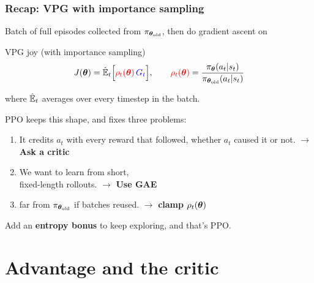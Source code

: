 \begin{frame}
    \frametitle{Recap: VPG with importance sampling}
    Batch of full episodes collected from $\pi_{{\boldsymbol{\theta}}_{\text{old}}}$, then do gradient ascent on
    \begin{block}{VPG joy (with importance sampling)}
        $$
        J({\boldsymbol{\theta}}) = \hat{\mathbb{E}}_t \Big[ \textcolor{red}{\rho_t({\boldsymbol{\theta}})} \, \textcolor{blue}{G_t} \Big],
        \qquad
        \textcolor{red}{\rho_t({\boldsymbol{\theta}})} = \frac{\pi_{\boldsymbol{\theta}}(a_t|s_t)}{\pi_{{\boldsymbol{\theta}}_{\text{old}}}(a_t|s_t)}
        $$
    \end{block}
    where $\hat{\mathbb{E}}_t$ averages over every timestep in the batch.

    \pause
    \vspace{0.3cm}
    PPO keeps this shape, and fixes three problems:
    \begin{enumerate}
        \item {} It credits $a_t$ with every reward that followed,
        whether $a_t$ caused it or not. \hfill $\to$ \textbf{Ask a critic}
        \item {} We want to learn from short, \\
        fixed-length rollouts. \hfill $\to$ \textbf{Use GAE}
        \item {} far from $\pi_{{\boldsymbol{\theta}}_{\text{old}}}$ if batches
        reused. \hfill $\to$ \textbf{clamp $\rho_t({\boldsymbol{\theta}})$}
    \end{enumerate}
    \pause
    Add an \textbf{entropy bonus} to keep exploring, and that's PPO.
\end{frame}

\section{Advantage and the critic}

